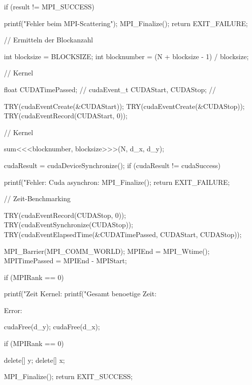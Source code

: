 \documentclass[doktyp=semarbeit, sprache=german]{TUBAFarbeiten}
\begin{document}
\begin{appendix}
\begin{CPP}
{  	if (result != MPI_SUCCESS) {
    	
   		printf("Fehler beim MPI-Scattering");
    		MPI_Finalize();
    		return EXIT_FAILURE;
  	}

	// Ermitteln der Blockanzahl	

  	int blocksize = BLOCKSIZE;
  	int blocknumber = (N + blocksize - 1) / blocksize;

	// Kernel

	float CUDATimePassed; // 
	cudaEvent_t CUDAStart, CUDAStop; // 
	
	TRY(cudaEventCreate(&CUDAStart));
	TRY(cudaEventCreate(&CUDAStop));
	TRY(cudaEventRecord(CUDAStart, 0));

	// Kernel

	sum<<<blocknumber, blocksize>>>(N, d_x, d_y);

  	cudaResult = cudaDeviceSynchronize();
  	if (cudaResult != cudaSuccess) {
	
        	printf("Fehler: Cuda asynchron: 
    		MPI_Finalize();
    		return EXIT_FAILURE;
  	}

	// Zeit-Benchmarking

	TRY(cudaEventRecord(CUDAStop, 0));
	TRY(cudaEventSynchronize(CUDAStop));
	TRY(cudaEventElapsedTime(&CUDATimePassed, CUDAStart, CUDAStop));

	MPI_Barrier(MPI_COMM_WORLD);
	MPIEnd = MPI_Wtime();
	MPITimePassed = MPIEnd - MPIStart;

	if (MPIRank == 0) {

		printf("\nBenoetigte Zeit Kernel: %
		printf("Gesamt benoetige Zeit: %
	}

	

Error:

  	cudaFree(d_y);
  	cudaFree(d_x);

  	if (MPIRank == 0) {

    		delete[] y;
    		delete[] x;
  	}

  	MPI_Finalize();
  	return EXIT_SUCCESS;
}
\end{CPP}
\end{appendix}
\newpage
{}
\end{document}
